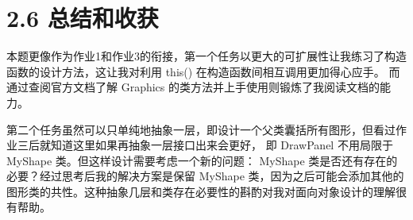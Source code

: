 

\section{2.6 总结和收获}

本题更像作为作业1和作业3的衔接，第一个任务以更大的可扩展性让我练习了构造函数的设计方法，这让我对利用 this() 在构造函数间相互调用更加得心应手。
而通过查阅官方文档了解 Graphics 的类方法并上手使用则锻炼了我阅读文档的能力。

第二个任务虽然可以只单纯地抽象一层，即设计一个父类囊括所有图形，但看过作业三后就知道这里如果再抽象一层接口出来会更好，
即 DrawPanel 不用局限于 MyShape 类。但这样设计需要考虑一个新的问题： MyShape 类是否还有存在的必要？经过思考后我的解决方案是保留
 MyShape 类，因为之后可能会添加其他的图形类的共性。这种抽象几层和类存在必要性的斟酌对我对面向对象设计的理解很有帮助。

